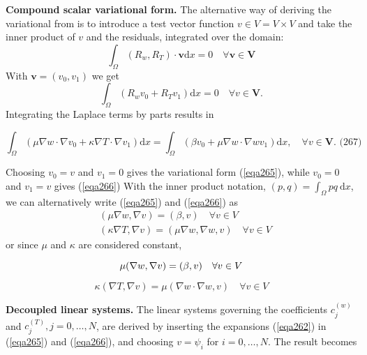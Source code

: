 \documentclass[../main.tex]{subfiles}
\begin{document}
		\noindent \textbf{Compound scalar variational form.   } The alternative way of deriving the variational from is to introduce a test vector function $v \in V=V \times V$ and take the inner product of $v$ and the residuals, integrated over the domain:
		$$
		\int_{\Omega}\left(R_{w}, R_{T}\right) \cdot \boldsymbol{v} \mathrm{d} x=0 \quad \forall \boldsymbol{v} \in \boldsymbol{V}
		$$
		With $\boldsymbol{v}=\left(v_{0}, v_{1}\right)$ we get
		$$
		\int_{\Omega}\left(R_{w} v_{0}+R_{T} v_{1}\right) \mathrm{d} x=0 \quad \forall v \in \boldsymbol{V} .
		$$
		Integrating the Laplace terms by parts results in
		
		\begin{equation}
			\label{eqa267}
			\int_{\Omega}\left(\mu \nabla w \cdot \nabla v_{0}+\kappa \nabla T \cdot \nabla v_{1}\right) \mathrm{d} x=\int_{\Omega}\left(\beta v_{0}+\mu \nabla w \cdot \nabla w v_{1}\right) \mathrm{d} x, \quad \forall v \in \boldsymbol{V} . \text { (267) }
		\end{equation}
	
		\noindent Choosing $v_{0}=v$ and $v_{1}=0$ gives the variational form (\ref{eqa265}), while $v_{0}=0$ and $v_{1}=v$ gives (\ref{eqa266})\smallbreak
		With the inner product notation, $(p, q)=\int_{\Omega} p q \mathrm{~d} x$, we can alternatively write (\ref{eqa265}) and (\ref{eqa266}) as
		$$
		\begin{aligned}
			&(\mu \nabla w, \nabla v)=(\beta, v) \quad \forall v \in V \\
			&(\kappa \nabla T, \nabla v)=(\mu \nabla w, \nabla w, v) \quad \forall v \in V
		\end{aligned}
		$$
		or since $\mu$ and $\kappa$ are considered constant,
		
		\begin{equation}
			\label{eqa268}
			\mu(\nabla w, \nabla v)=(\beta, v) \quad \forall v \in V \\
		\end{equation}
	
		\begin{equation}
		\label{eqa269}
			\kappa(\nabla T, \nabla v)=\mu(\nabla w \cdot \nabla w, v) \quad \forall v \in V
		\end{equation}
		
		\noindent \textbf{Decoupled linear systems.   } The linear systems governing the coefficients $c_{j}^{(w)}$ and $c_{j}^{(T)}, j=0, \ldots, N$, are derived by inserting the expansions (\ref{eqa262}) in (\ref{eqa265}) and (\ref{eqa266}), and choosing $v=\psi_{i}$ for $i=0, \ldots, N$. The result becomes
	
\end{document}
